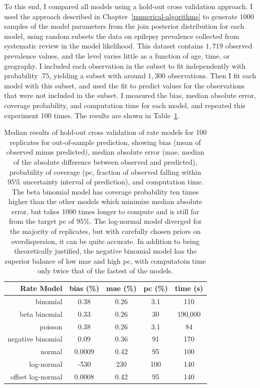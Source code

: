 To this end, I compared all models using a hold-out cross validation
approach.  I used the approach described in
Chapter~\ref{numerical-algorithms} to generate $1000$ samples of the
model parameters from the join posterior distribution for each model,
using random subsets the data on epilepsy prevalence collected from
systematic review\cite{TK} in the model likelihood.  This dataset
contains $1,719$ observed prevalence values, and the level varies
little as a function of age, time, or geography.  I included each
observation in the subset to fit independently with probability $.75$,
yielding a subset with around $1,300$ observations. Then I fit each
model with this subset, and used the fit to predict values for the
observations that were not included in the subset.  I measured the
bias, median absolute error, coverage probability, and computation
time for each model, and repeated this experiment 100 times.  The
results are shown in Table~\ref{rate-comparison}.

\begin{table}
\begin{center}
\begin{tabular}{|r|c|c|c|c|}
\hline
Rate Model       &bias (\%)&mae (\%)&pc (\%)&time (s)\\
\hline
binomial         &0.38     &0.26    &3.1    &110\\
beta binomial    &0.33     &0.26    &30     &190,000\\
poisson          &0.38     &0.26    &3.1    &84\\
negative binomial&0.09     &0.36    &91     &170\\
normal           &0.0009   &0.42    &95     &100\\
log-normal       &-530     &230     &100    &140\\
offset log-normal&0.0008   &0.42    &95     &140\\
\hline
\end{tabular}
\end{center}
\caption{Median results of hold-out cross validation of rate models
  for 100 replicates for out-of-sample prediction, showing bias (mean
  of observed minus predicted), median absolute error (mae, median of
  the absolute difference between observed and predicted), probability
  of coverage (pc, fraction of observed falling within 95\% uncertainty
  interval of prediction), and computation time.  The beta binomial
  model has coverage probability ten times higher than the other
  models which minimize median absolute error, but takes 1000 times
  longer to compute and is still far from the target pc of $95\%$.
  The log-normal model diverged for the majority of replicates, but
  with carefully chosen priors on overdispersion, it can be quite
  accurate.  In addition to being theoretically justified, the
  negative binomial model has the superior balance of low mae and high
  pc, with computatoin time only twice that of the fastest of the
  models.}
\label{rate-comparison}
\end{table}


